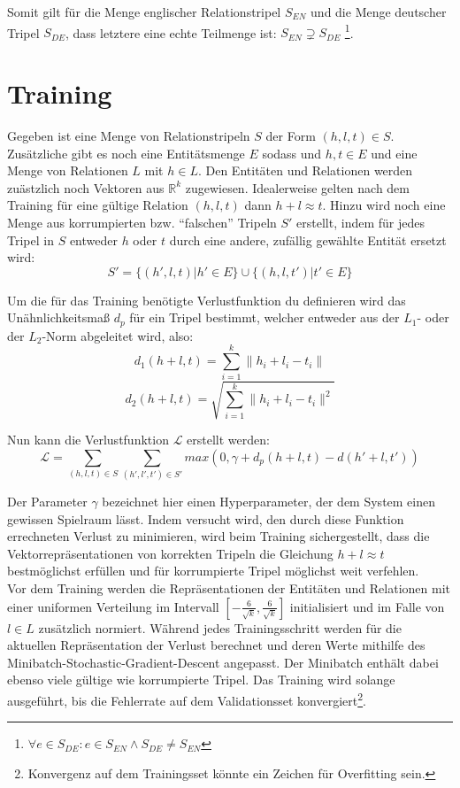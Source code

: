Somit gilt für die Menge englischer Relationstripel $S_{EN}$ und die Menge deutscher Tripel $S_{DE}$, dass letztere
eine echte Teilmenge ist: $S_{EN} \supsetneq S_{DE}$ \footnote{$\forall e \in S_{DE}: e \in S_{EN} \wedge S_{DE} \neq S_{EN}$}.

\section{Training}

Gegeben ist eine Menge von Relationstripeln $S$ der Form $(h, l, t) \in S$. Zusätzliche gibt es noch eine Entitätsmenge
$E$ sodass und $h, t \in E$ und eine Menge von Relationen $L$ mit $h \in L$. Den Entitäten und Relationen werden zuästzlich
noch Vektoren aus $\mathbb{R}^k$ zugewiesen. Idealerweise gelten nach dem Training für eine gültige Relation $(h, l, t)$
dann $h + l \approx t$. Hinzu wird noch eine Menge aus korrumpierten bzw. ``falschen'' Tripeln $S'$ erstellt, indem
für jedes Tripel in $S$ entweder $h$ oder $t$ durch eine andere, zufällig gewählte Entität ersetzt wird:
\begin{equation}
  S' = \{(h', l, t) | h' \in E\} \cup \{(h, l, t') | t' \in E\}
\end{equation}

Um die für das Training benötigte Verlustfunktion du definieren wird das Unähnlichkeitsmaß $d_p$ für ein Tripel bestimmt, welcher
entweder aus der $L_1$- oder der $L_2$-Norm abgeleitet wird, also:
\begin{equation}
    d_1(h + l, t) = \sum_{i=1}^k \| h_i + l_i - t_i \|
\end{equation}
\begin{equation}
    d_2(h + l, t) = \sqrt{\sum_{i=1}^k \| h_i + l_i - t_i \|^2}
\end{equation}

Nun kann die Verlustfunktion $\mathcal{L}$ erstellt werden:
\begin{equation}
  \mathcal{L} = \sum_{(h,l,t) \in S} \sum_{(h', l', t') \in S'} max(0, \gamma + d_p(h + l, t) - d(h' + l, t'))
\end{equation}

Der Parameter $\gamma$ bezeichnet hier einen Hyperparameter, der dem System einen gewissen Spielraum lässt. Indem versucht
wird, den durch diese Funktion errechneten Verlust zu minimieren, wird beim Training sichergestellt, dass die Vektorrepräsentationen
von korrekten Tripeln die Gleichung $h + l \approx t$ bestmöglichst erfüllen und für korrumpierte Tripel möglichst weit
verfehlen.\\
Vor dem Training werden die Repräsentationen der Entitäten und Relationen mit einer uniformen Verteilung im Intervall
$[-\frac{6}{\sqrt{k}}, \frac{6}{\sqrt{k}}]$ initialisiert und im Falle von $l \in L$ zusätzlich normiert. Während jedes
Trainingsschritt werden für die aktuellen Repräsentation der Verlust berechnet und deren Werte mithilfe des
Minibatch-Stochastic-Gradient-Descent angepasst. Der Minibatch enthält dabei ebenso viele gültige wie korrumpierte Tripel.
Das Training wird solange ausgeführt, bis die Fehlerrate auf dem Validationsset konvergiert\footnote{Konvergenz auf dem
Trainingsset könnte ein Zeichen für Overfitting sein.}.\\

